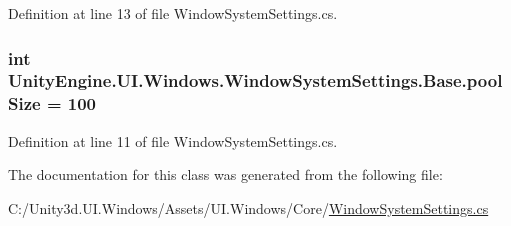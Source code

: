 Definition at line 13 of file Window\+System\+Settings.\+cs.

\hypertarget{class_unity_engine_1_1_u_i_1_1_windows_1_1_window_system_settings_1_1_base_a9714f9dd6ed7f94c42fc3d3d55622170}{}
\subsubsection[{pool\+Size}]{\setlength{\rightskip}{0pt plus 5cm}int Unity\+Engine.\+U\+I.\+Windows.\+Window\+System\+Settings.\+Base.\+pool\+Size = 100}\label{class_unity_engine_1_1_u_i_1_1_windows_1_1_window_system_settings_1_1_base_a9714f9dd6ed7f94c42fc3d3d55622170}


Definition at line 11 of file Window\+System\+Settings.\+cs.



The documentation for this class was generated from the following file\+:\begin{DoxyCompactItemize}
\item 
C\+:/\+Unity3d.\+U\+I.\+Windows/\+Assets/\+U\+I.\+Windows/\+Core/\hyperlink{_window_system_settings_8cs}{Window\+System\+Settings.\+cs}\end{DoxyCompactItemize}
